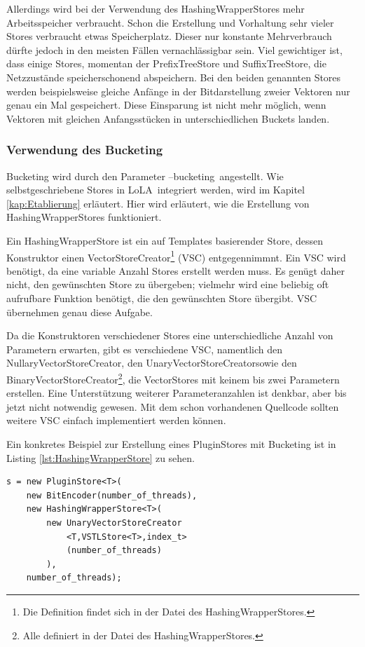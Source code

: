 \documentclass[12pt,a4paper,titlepage]{scrartcl}
\renewcommand \( {\left (}
\renewcommand \) {\right )}
\renewcommand \[ {\left [}
\renewcommand \] {\right ]}
\newcommand \Flqq {\flqq\ }
\newcommand{\lola}{\frqq LoLA\Flqq}
\begin{document}
Allerdings wird bei der Verwendung des HashingWrapperStores mehr Arbeitsspeicher verbraucht. Schon die Erstellung und Vorhaltung sehr vieler Stores verbraucht etwas Speicherplatz. Dieser nur konstante Mehrverbrauch dürfte jedoch in den meisten Fällen vernachlässigbar sein. Viel gewichtiger ist, dass einige Stores, momentan der PrefixTreeStore und SuffixTreeStore, die Netzzustände speicherschonend abspeichern. Bei den beiden genannten Stores werden beispielsweise gleiche Anfänge in der Bitdarstellung zweier Vektoren nur genau ein Mal gespeichert. Diese Einsparung ist nicht mehr möglich, wenn Vektoren mit gleichen Anfangsstücken in unterschiedlichen Buckets landen.

\subsubsection{Verwendung des Bucketing}
Bucketing wird durch den Parameter \frqq --bucketing\Flqq angestellt. Wie selbstgeschriebene Stores in \lola integriert werden, wird im Kapitel \ref{kap:Etablierung} erläutert. Hier wird erläutert, wie die Erstellung von HashingWrapperStores funktioniert.

Ein HashingWrapperStore ist ein auf Templates basierender Store, dessen Konstruktor einen VectorStoreCreator\footnote{Die Definition findet sich in der Datei des HashingWrapperStores.} (VSC) entgegennimmnt. Ein VSC wird benötigt, da eine variable Anzahl Stores erstellt werden muss. Es genügt daher nicht, den gewünschten Store zu übergeben; vielmehr wird eine beliebig oft aufrufbare Funktion benötigt, die den gewünschten Store übergibt. VSC übernehmen genau diese Aufgabe.

Da die Konstruktoren verschiedener Stores eine unterschiedliche Anzahl von Parametern erwarten, gibt es verschiedene VSC, namentlich den \frqq NullaryVectorStoreCreator\frqq, den \frqq UnaryVectorStoreCreator\Frqq sowie den \frqq BinaryVectorStoreCreator\flqq\footnote{Alle definiert in der Datei des HashingWrapperStores.}, die VectorStores mit keinem bis zwei Parametern erstellen. Eine Unterstützung weiterer Parameteranzahlen ist denkbar, aber bis jetzt nicht notwendig gewesen. Mit dem schon vorhandenen Quellcode sollten weitere VSC einfach implementiert werden können.

Ein konkretes Beispiel zur Erstellung eines PluginStores mit Bucketing ist in Listing \ref{lst:HashingWrapperStore} zu sehen.

\begin{center}
\begin{minipage}{0.7\textwidth}
\lstset{language=C++}
\begin{lstlisting}[label=lst:HashingWrapperStore,caption={Erstellung eines PluginStores mit Bucketing. Dem HashingWrapperStore wird ein UnaryVectorStoreCreator übergeben, welcher einen VSTLStore erstellt. Das Argument des VSC-Konstruktors wird an jeden erstellten VSTL-Store weitergereicht.}]
s = new PluginStore<T>(
	new BitEncoder(number_of_threads),
	new HashingWrapperStore<T>(
		new UnaryVectorStoreCreator
			<T,VSTLStore<T>,index_t>
			(number_of_threads)
		),
	number_of_threads);
\end{lstlisting}
\end{minipage}
\end{center}
\end{document}
